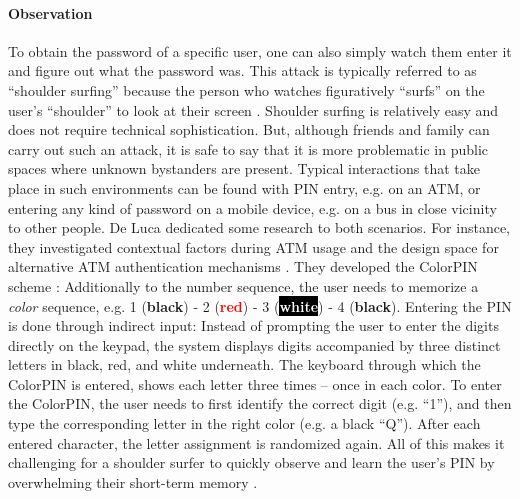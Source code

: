 
\paragraph{Observation} 
To obtain the password of a specific user, one can also simply watch them enter it and figure out what the password was. This attack is typically referred to as ``shoulder surfing'' because the person who watches figuratively ``surfs'' on the user's ``shoulder'' to look at their screen \cite{Tari2006ShoulderSurfingComparison}. Shoulder surfing is relatively easy and does not require technical sophistication. But, although friends and family can carry out such an attack, it is safe to say that it is more problematic in public spaces where unknown bystanders are present. Typical interactions that take place in such environments can be found with PIN entry, e.g. on an ATM, or entering any kind of password on a mobile device, e.g. on a bus in close vicinity to other people. 
De Luca \etal dedicated some research to both scenarios. For instance, they investigated contextual factors during ATM usage and the design space for alternative ATM authentication mechanisms \cite{DeLuca2010UnderstandingATMSecurity}. They developed the ColorPIN scheme \cite{DeLuca2010ColorPIN}: Additionally to the number sequence, the user needs to memorize a \textit{color} sequence, e.g. 1 (\textbf{black}) - 2 (\textcolor{red}{\textbf{red}}) - 3 (\colorbox{black}{\textcolor{white}{\textbf{white}}}) - 4 (\textbf{black}).
Entering the PIN is done through indirect input: Instead of prompting the user to enter the digits directly on the keypad, the system displays digits accompanied by three distinct letters in black, red, and white underneath. The keyboard through which the ColorPIN is entered, shows each letter three times -- once in each color. To enter the ColorPIN, the user needs to first identify the correct digit (e.g. ``1''), and then type the corresponding letter in the right color (e.g. a black ``Q''). After each entered character, the letter assignment is randomized again. All of this makes it challenging for a shoulder surfer to quickly observe and learn the user's PIN by overwhelming their short-term memory \cite{Dunphy2010CloserLookGraphical}.

